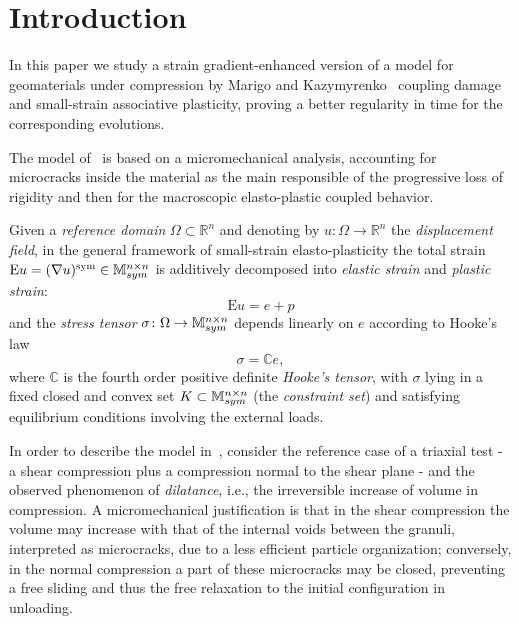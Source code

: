 \documentclass[reqno]{amsart}
\theoremstyle{definition}
\numberwithin{equation}{section}
\def\R {\mathbb R}
\def\M {\mathbb M^{n\times n}_{\rm sym}}
\def\C {\mathbb C}
\def\EE {\mathrm{E}}
\begin{document}

\maketitle


\section{Introduction}

In this paper we study a strain gradient-enhanced version of a model for geomaterials under compression by Marigo and Kazymyrenko~\cite{KazMar18} coupling damage and small-strain associative plasticity, proving a better regularity in time for the corresponding evolutions. 

The model of~\cite{KazMar18} is based on a micromechanical analysis, accounting for microcracks inside the material as the main responsible of the progressive loss of rigidity and then for the macroscopic elasto-plastic coupled behavior.


Given a \emph{reference domain} $\Omega\subset\R^n$ and denoting by $u\colon \Omega\to \R^n$ the \emph{displacement field}, in the general framework of small-strain elasto-plasticity the total strain $\EE u = (\nabla u)^{\mathrm{sym}} \in \M$ is additively decomposed into \emph{elastic strain} and \emph{plastic strain}:
$$\EE u=e+p$$
and the \emph{stress tensor} $\sigma\colon \Omega\to \M$ depends linearly on $e$ according to Hooke's law 
$$\sigma=\C e,$$
where $\C$ is the fourth order positive definite \emph{Hooke's tensor}, with $\sigma$ lying in a fixed closed and convex set $K \subset \M$ (the \emph{constraint set}) and satisfying equilibrium conditions involving the external loads.

In order to describe the model in~\cite{KazMar18}, consider the reference case of a triaxial test - a shear compression plus a compression normal to the shear plane - and the observed phenomenon of \emph{dilatance}, i.e., the irreversible increase of volume in compression. A micromechanical justification is that in the shear compression the volume may increase with that of the internal voids between the granuli, interpreted as microcracks, due to a less efficient particle organization; conversely, in the normal compression a part of these microcracks may be closed, preventing a free sliding and thus the free relaxation to the initial configuration in unloading.
\end{document}
